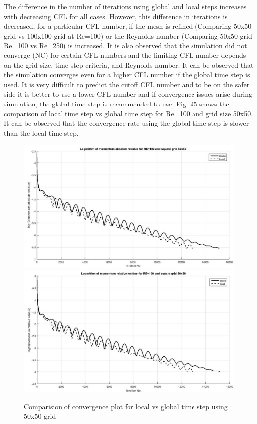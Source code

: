 \documentclass[12pt]{elsarticle}
\begin{document}
	The difference in the number of iterations using global and local steps increases with decreasing CFL for all cases. However, this difference in iterations is decreased, for a particular CFL number, if the mesh is refined (Comparing 50x50 grid vs 100x100 grid at Re=100) or the Reynolds number (Comparing 50x50 grid Re=100 vs Re=250) is increased. It is also observed that the simulation did not converge (NC) for certain CFL numbers and the limiting CFL number depends on the grid size, time step criteria, and Reynolds number. It can be observed that the simulation converges even for a higher CFL number if the global time step is used. It is very difficult to predict the cutoff CFL number and to be on the safer side it is better to use a lower CFL number and if convergence issues arise during simulation, the global time step is recommended to use. Fig. 45 shows the comparison of local time step vs global time step for Re=100 and grid size 50x50. It can be observed that the convergence rate using the global time step is slower than the local time step.
	
	\begin{figure}[h]
		\caption{Comparision of convergence plot for local vs global time step using 50x50 grid }
		\centering\includegraphics[width=1.0\linewidth]{global_local_ar}
		\centering\includegraphics[width=1.0\linewidth]{global_local_rr}
	\end{figure}
	\clearpage
	
\end{document}
